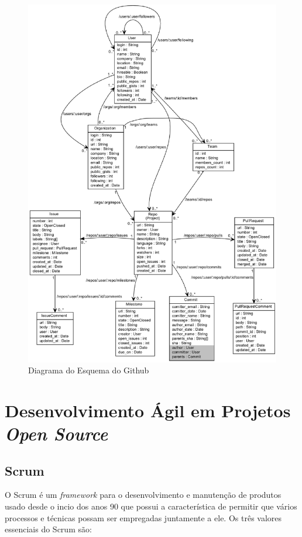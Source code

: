 \newpage
\begin{figure}[!h]
    \centering
        \includegraphics[width=\textwidth,height=\textheight,keepaspectratio=true]{figuras/gtschema.eps}
    \caption{Diagrama do Esquema do Github}
    \label{fig:github_api}
\end{figure}

\section{Desenvolvimento Ágil em Projetos \textit{Open Source}}
\label{red:des}

\subsection{Scrum}
O Scrum é um \textit{framework} para o desenvolvimento e manutenção de produtos usado desde o incio dos anos 90 que possui a característica de permitir que vários processos e técnicas possam ser empregadas juntamente a ele. Os três valores essenciais do Scrum são:

